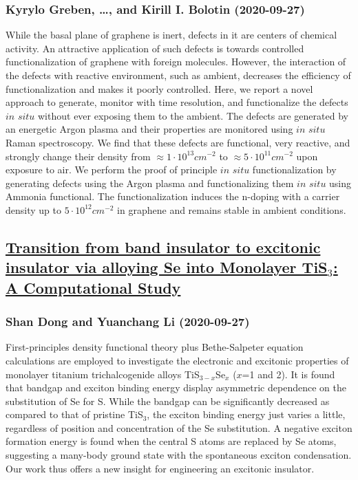 \subsubsection*{Kyrylo Greben, \dots, and Kirill I. Bolotin (2020-09-27)}
While the basal plane of graphene is inert, defects in it are centers of
chemical activity. An attractive application of such defects is towards
controlled functionalization of graphene with foreign molecules. However, the
interaction of the defects with reactive environment, such as ambient,
decreases the efficiency of functionalization and makes it poorly controlled.
Here, we report a novel approach to generate, monitor with time resolution, and
functionalize the defects $\textit{in situ}$ without ever exposing them to the
ambient. The defects are generated by an energetic Argon plasma and their
properties are monitored using $\textit{in situ}$ Raman spectroscopy. We find
that these defects are functional, very reactive, and strongly change their
density from $\approx 1\cdot10^{13} cm^{-2}$ to $\approx 5\cdot10^{11} cm^{-2}$
upon exposure to air. We perform the proof of principle $\textit{in situ}$
functionalization by generating defects using the Argon plasma and
functionalizing them $\textit{in situ}$ using Ammonia functional. The
functionalization induces the n-doping with a carrier density up to
$5\cdot10^{12} cm^{-2}$ in graphene and remains stable in ambient conditions.

\subsection*{\href{http://arxiv.org/abs/2009.12805v1}{Transition from band insulator to excitonic insulator via alloying Se  into Monolayer TiS$_3$: A Computational Study}}
\subsubsection*{Shan Dong and Yuanchang Li (2020-09-27)}
First-principles density functional theory plus Bethe-Salpeter equation
calculations are employed to investigate the electronic and excitonic
properties of monolayer titanium trichalcogenide alloys TiS$_{3-x}$Se$_x$
($x$=1 and 2). It is found that bandgap and exciton binding energy display
asymmetric dependence on the substitution of Se for S. While the bandgap can be
significantly decreased as compared to that of pristine TiS$_3$, the exciton
binding energy just varies a little, regardless of position and concentration
of the Se substitution. A negative exciton formation energy is found when the
central S atoms are replaced by Se atoms, suggesting a many-body ground state
with the spontaneous exciton condensation. Our work thus offers a new insight
for engineering an excitonic insulator.

